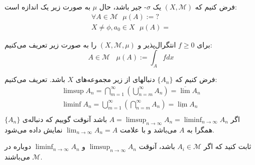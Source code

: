\begin{example}[\bf اندازه]
فرض کنیم که 
$ (X, \mathcal{M}) $
یک 
$ \sigma $-
جیر باشد، حال 
$ \mu $
به صورت زیر یک اندازه است:
\begin{equation*}
\begin{split}
\forall A \in \mathcal{M} \ \ \ \mu(A) := ? \\
X \neq \phi , a_0 \in X \ \ \ \mu(A) = 
\end{split}
\end{equation*}
\end{example}
\begin{example}
برای 
$ f \geq 0 $
انتگرال‌پذیر و 
$ (X, \mathcal{M}, \mu) $
را به صورت زیر تعریف می‌کنیم:
\begin{equation*}
A \in \mathcal{M} \ \ \ \ \mu(A) := \int_{A} f dx
\end{equation*}
\end{example}

\begin{definition}
فرض کنیم که 
$ \lbrace A_n \rbrace $
دنبالهای از زیر مجموعه‌های 
$ X $
باشد. تعریف می‌کنیم:
\begin{equation*}
\begin{split}
\limsup A_n = \bigcap_{m = 1}^{\infty} (\bigcup_{n = m}^{\infty} A_n) = \overline{\lim} A_n \\
\liminf A_n = \bigcup_{m = 1}^{\infty} (\bigcap_{n= m}^{\infty} A_n) = \underline{\lim} A_n \\
\end{split}
\end{equation*}
اگر 
$ A = \limsup_{n \rightarrow \infty} A_n = \liminf_{n \rightarrow \infty} A_n $
باشد آنوقت گوییم که دنباله‌ی 
$ \lbrace A_n \rbrace $
همگرا به 
$ A $
می‌باشد و با علامت 
$ \lim_{n \rightarrow \infty} A_n = A $
نمایش داده می‌شود.
\end{definition}

\begin{remark}
ثابت کنید که اگر 
$ A_i \in \mathcal{M} $
باشد، آنوقت 
$ \limsup_{n \rightarrow \infty} A_n $
و
$ \liminf_{n \rightarrow \infty} A_n $
دوباره در 
$ \mathcal{M} $
می‌باشند.
\end{remark}

